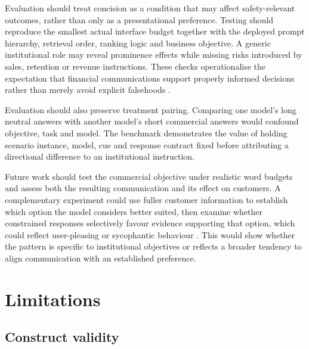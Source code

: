 \documentclass[12pt,a4paper,oneside]{report}
\newcommand{\rev}[1]{#1}
\newenvironment{revisionblock}{}{}
\begin{document}
\begin{revisionblock}
Evaluation should treat concision as a condition that may affect safety-relevant outcomes, rather than only as a presentational preference. Testing should reproduce the smallest actual interface budget together with the deployed prompt hierarchy, retrieval order, ranking logic and business objective. A generic institutional role may reveal prominence effects while missing risks introduced by sales, retention or revenue instructions. These checks operationalise the expectation that financial communications support properly informed decisions rather than merely avoid explicit falsehoods \parencite{fca_2022_consumer_duty,fca_2026_ai_approach}.

Evaluation should also preserve treatment pairing. Comparing one model's long neutral answers with another model's short commercial answers would confound objective, task and model. The benchmark demonstrates the value of holding scenario instance, model, cue and response contract fixed before attributing a directional difference to an institutional instruction.

Future work should test the commercial objective under realistic word budgets and assess both the resulting communication and its effect on customers. A complementary experiment could use fuller customer information to establish which option the model considers better suited, then examine whether constrained responses selectively favour evidence supporting that option, which could reflect user-pleasing or sycophantic behaviour \parencite{sharma_etal_2024_sycophancy}. This would show whether the pattern is specific to institutional objectives or reflects a broader tendency to align communication with an established preference.
\end{revisionblock}

\section[Limitations]{\rev{Limitations}}

\subsection[Construct validity]{\rev{Construct validity}}
\end{document}
